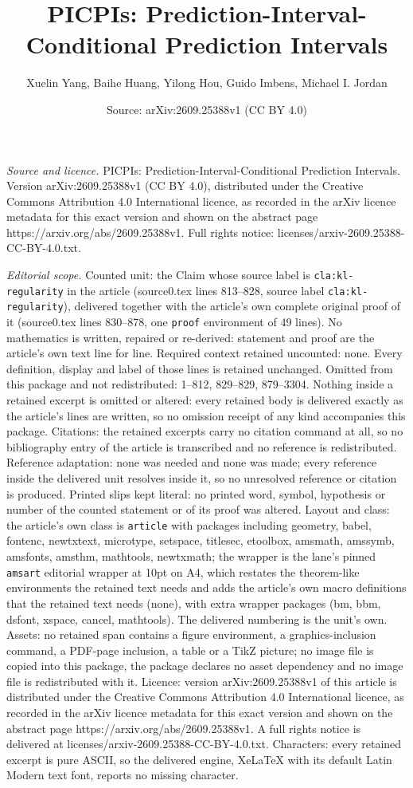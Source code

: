 \documentclass[10pt,a4paper]{amsart}
\title[PICPIs: Prediction-Interval-Conditional Prediction Intervals]{PICPIs: Prediction-Interval-Conditional Prediction Intervals}
\author{Xuelin Yang, Baihe Huang, Yilong Hou, Guido Imbens, Michael I. Jordan}
\date{Source: arXiv:2609.25388v1 (CC BY 4.0)}
\begin{document}
\maketitle

\noindent\emph{Source and licence.} PICPIs: Prediction-Interval-Conditional Prediction Intervals. Version arXiv:2609.25388v1 (CC BY 4.0), distributed under the Creative Commons Attribution 4.0 International licence, as recorded in the arXiv licence metadata for this exact version and shown on the abstract page https://arxiv.org/abs/2609.25388v1. Full rights notice: licenses/arxiv-2609.25388-CC-BY-4.0.txt.\par\smallskip

\noindent\textit{Editorial scope.} Counted unit: the Claim whose source label is \texttt{cla:kl-regularity} in the article (source0.tex lines 813--828, source label \texttt{cla:kl-regularity}), delivered together with the article's own complete original proof of it (source0.tex lines 830--878, one \texttt{proof} environment of 49 lines). No mathematics is written, repaired or re-derived: statement and proof are the article's own text line for line. Required context retained uncounted: none. Every definition, display and label of those lines is retained unchanged. Omitted from this package and not redistributed: 1--812, 829--829, 879--3304. Nothing inside a retained excerpt is omitted or altered: every retained body is delivered exactly as the article's lines are written, so no omission receipt of any kind accompanies this package. Citations: the retained excerpts carry no citation command at all, so no bibliography entry of the article is transcribed and no reference is redistributed. Reference adaptation: none was needed and none was made; every reference inside the delivered unit resolves inside it, so no unresolved reference or citation is produced. Printed slips kept literal: no printed word, symbol, hypothesis or number of the counted statement or of its proof was altered. Layout and class: the article's own class is \texttt{article} with packages including geometry, babel, fontenc, newtxtext, microtype, setspace, titlesec, etoolbox, amsmath, amssymb, amsfonts, amsthm, mathtools, newtxmath; the wrapper is the lane's pinned \texttt{amsart} editorial wrapper at 10pt on A4, which restates the theorem-like environments the retained text needs and adds the article's own macro definitions that the retained text needs (none), with extra wrapper packages (bm, bbm, dsfont, xspace, cancel, mathtools). The delivered numbering is the unit's own. Assets: no retained span contains a figure environment, a graphics-inclusion command, a PDF-page inclusion, a table or a TikZ picture; no image file is copied into this package, the package declares no asset dependency and no image file is redistributed with it. Licence: version arXiv:2609.25388v1 of this article is distributed under the Creative Commons Attribution 4.0 International licence, as recorded in the arXiv licence metadata for this exact version and shown on the abstract page https://arxiv.org/abs/2609.25388v1. A full rights notice is delivered at licenses/arxiv-2609.25388-CC-BY-4.0.txt. Characters: every retained excerpt is pure ASCII, so the delivered engine, XeLaTeX with its default Latin Modern text font, reports no missing character.
\end{document}
